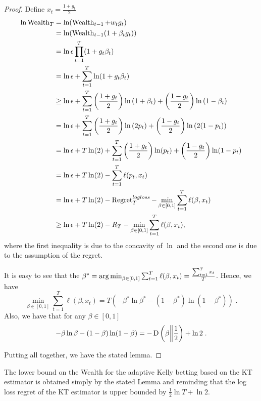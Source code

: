 \begin{proof}
Define $x_t=\tfrac{1+g_t}{2}$
\begin{align*}
\ln \operatorname{Wealth}_T
& = \ln (\operatorname{Wealth}_{t-1} + w_t g_t) \\
& = \ln  (\operatorname{Wealth}_{t-1}(1 + \beta_t g_t))\\
& = \ln \epsilon \prod_{t=1}^T (1 + g_t\beta_t) \\
& = \ln \epsilon + \sum_{t=1}^T \ln (1 + g_t\beta_t)\\
& \ge \ln \epsilon +  \sum_{t=1}^T \left( \frac{1+g_t}{2} \right) \ln \left(1 + \beta_t\right) + \left( \frac{1-g_t}{2} \right) \ln \left(1 - \beta_t \right) \\
& =  \ln \epsilon + \sum_{t=1}^T \left( \frac{1+g_t}{2} \right) \ln \left(2p_t \right) + \left( \frac{1-g_t}{2} \right) \ln \left(2 (1 - p_t) \right) \\
& =  \ln \epsilon + T \ln(2) + \sum_{t=1}^T \left( \frac{1+g_t}{2} \right) \ln (p_t) + \left( \frac{1-g_t}{2} \right) \ln (1 - p_t) \\
& =  \ln \epsilon + T \ln(2) - \sum_{t=1}^T \ell(p_t, x_t) \\
& =  \ln \epsilon + T \ln(2) - \operatorname{Regret}^{logloss}_T - \min_{\beta \in [0,1]} \sum_{t=1}^T \ell(\beta,x_t) \\
& \geq  \ln \epsilon + T \ln(2) - R_T - \min_{\beta \in [0,1]} \sum_{t=1}^T \ell(\beta,x_t),
\end{align*}
where the first inequality is due to the concavity of $\ln$ and the second one is due to the assumption of the regret.

It is easy to see that the $\beta^*=\operatorname*{arg\,min}_{\beta \in [0,1]} \sum_{t=1}^T \ell(\beta,x_t)=\tfrac{\sum_{t=1}^T x_t}{T}$. Hence, we have
\[
\min_{\beta \in [0,1]} \sum_{t=1}^T \ell(\beta,x_t) = T \left( - \beta^* \ln \beta^* - (1-\beta^*) \ln (1-\beta^*)\right) \; .
\]
Also, we have that for any $\beta \in [0,1]$
\[
- \beta \ln \beta - (1-\beta) \ln (1-\beta) = - \operatorname{D}\left({\beta}\middle\|{\frac{1}{2}}\right) + \ln 2 \; .
\]

Putting all together, we have the stated lemma.
\end{proof} 

The lower bound on the Wealth for the adaptive Kelly betting based on the KT estimator is obtained simply by the stated Lemma and reminding that the log loss regret of the KT estimator is upper bounded by $\frac{1}{2}\ln T + \ln 2$. 